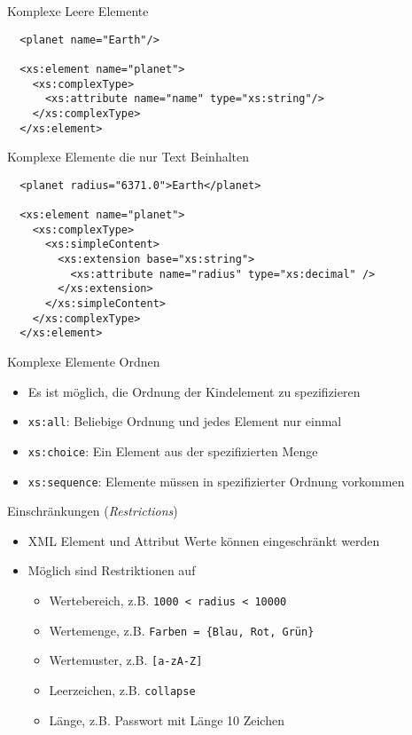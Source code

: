 \documentclass{beamer}
\begin{document}
\begin{frame}[fragile]{Komplexe Leere Elemente}
	
	\lstset{language=XML}
	\begin{lstlisting}	
  <planet name="Earth"/>

  <xs:element name="planet">
    <xs:complexType>
      <xs:attribute name="name" type="xs:string"/>
    </xs:complexType>
  </xs:element>
	\end{lstlisting}
	
\end{frame}

\begin{frame}[fragile]{Komplexe Elemente die nur Text Beinhalten}
	
	\lstset{language=XML}
	\begin{lstlisting}	
  <planet radius="6371.0">Earth</planet>
	
  <xs:element name="planet">
    <xs:complexType>
      <xs:simpleContent>
        <xs:extension base="xs:string">
          <xs:attribute name="radius" type="xs:decimal" />
        </xs:extension>
      </xs:simpleContent>
    </xs:complexType>
  </xs:element>
	\end{lstlisting}
	
\end{frame}

\begin{frame}[fragile]{Komplexe Elemente Ordnen}
	
	\begin{itemize}
		\item Es ist möglich, die Ordnung der Kindelement zu spezifizieren
		\item \texttt{xs:all}: Beliebige Ordnung und jedes Element nur einmal
		\item \texttt{xs:choice}: Ein Element aus der spezifizierten Menge
		\item \texttt{xs:sequence}: Elemente müssen in spezifizierter Ordnung vorkommen
	\end{itemize}
	
\end{frame}


\begin{frame}[fragile]{Einschränkungen (\emph{Restrictions})}
	
	\begin{itemize}
		\item XML Element und Attribut Werte können eingeschränkt werden
		\item Möglich sind Restriktionen auf
		\begin{itemize}
			\item Wertebereich, z.B. \texttt{1000 < radius < 10000}
			\item Wertemenge, z.B. \texttt{Farben = \{Blau, Rot, Grün\}}
			\item Wertemuster, z.B. \texttt{[a-zA-Z]}
			\item Leerzeichen, z.B. \texttt{collapse}
			\item Länge, z.B. Passwort mit Länge 10 Zeichen
		\end{itemize}
	\end{itemize}
	
\end{frame}
\end{document}
